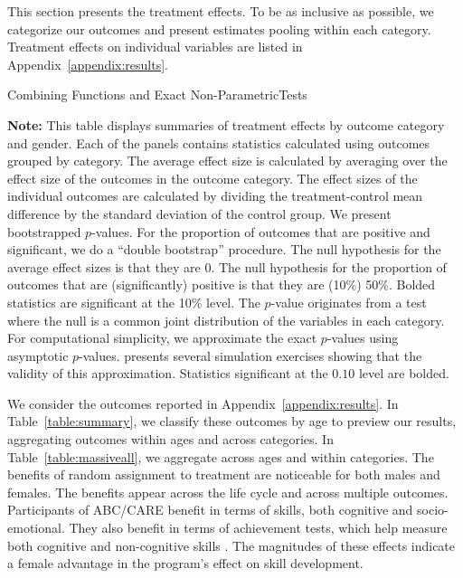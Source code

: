This section presents the treatment effects. To be as inclusive as possible, we categorize our outcomes and present estimates pooling within each category. Treatment effects on individual variables are listed in Appendix~\ref{appendix:results}.

\begin{table}[!htpb]
\begin{threeparttable}
\caption{Combining Functions and Exact Non-ParametricTests} \label{table:massiveall}
\centering
 
\begin{tablenotes}
\scriptsize
\item \textbf{Note:} This table displays summaries of treatment effects by outcome category and gender. Each of the panels contains statistics calculated using outcomes grouped by category. The average effect size is calculated by averaging over the effect size of the outcomes in the outcome category. The effect sizes of the individual outcomes are calculated by dividing the treatment-control mean difference by the standard deviation of the control group. We present bootstrapped $p$-values. For the proportion of outcomes that are positive and significant, we do a ``double bootstrap'' procedure. The null hypothesis for the average effect sizes is that they are 0. The null hypothesis for the proportion of outcomes that are (significantly) positive is that they are (10\%) 50\%. Bolded statistics are significant at the 10\% level. The \citet{Rosenbaum_2005_Distribution_JRSS} $p$-value originates from a test where the null is a common joint distribution of the variables in each category. For computational simplicity, we approximate the exact $p$-values using asymptotic $p$-values. \citet{Rosenbaum_2005_Distribution_JRSS} presents several simulation exercises showing that the validity of this approximation. Statistics significant at the $0.10$ level are bolded.
\end{tablenotes}
\end{threeparttable}
\end{table}

We consider the outcomes reported in Appendix~\ref{appendix:results}. In Table~\ref{table:summary}, we classify these outcomes by age to preview our results, aggregating outcomes within ages and across categories. In Table~\ref{table:massiveall}, we aggregate across ages and within categories. The benefits of random assignment to treatment are noticeable for both males and females. The benefits appear across the life cycle and across multiple outcomes. Participants of ABC/CARE benefit in terms of skills, both cognitive and socio-emotional. They also benefit in terms of achievement tests, which help measure both cognitive and non-cognitive skills \citep{Almlund_Duckworth_etal_2011_ecoval}. The magnitudes of these effects indicate a female advantage in the program's effect on skill development.

